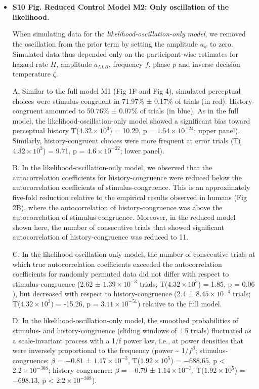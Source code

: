 \documentclass[
]{article}
\begin{document}
\begin{itemize}
\item \textbf{S10 Fig. Reduced Control Model M2: Only oscillation of the likelihood.}

When simulating data for the
\emph{likelihood-oscillation-only model}, we removed the oscillation
from the prior term by setting the amplitude \(a_{\psi}\) to zero.
Simulated data thus depended only on the participant-wise estimates for
hazard rate \(H\), amplitude \(a_{LLR}\), frequency \(f\), phase \(p\)
and inverse decision temperature \(\zeta\).

A. Similar to the full model M1 (Fig 1F and Fig 4), simulated
perceptual choices were stimulus-congruent in 71.97\% ± 0.17\% of trials
(in red). History-congruent amounted to 50.76\% ± 0.07\% of trials (in
blue). As in the full model, the likelihood-oscillation-only model
showed a significant bias toward perceptual history
T(\ensuremath{4.32\times 10^{3}}) = 10.29, p =
\(\ensuremath{1.54\times 10^{-24}}\); upper panel). Similarly,
history-congruent choices were more frequent at error trials
(T(\ensuremath{4.32\times 10^{3}}) = 9.71, p =
\(\ensuremath{4.6\times 10^{-22}}\); lower panel).

B. In the likelihood-oscillation-only model, we observed that the
autocorrelation coefficients for history-congruence were reduced below
the autocorrelation coefficients of stimulus-congruence. This is an
approximately five-fold reduction relative to the empirical results
observed in humans (Fig 2B), where the autocorrelation of
history-congruence was above the autocorrelation of stimulus-congruence.
Moreover, in the reduced model shown here, the number of consecutive
trials that showed significant autocorrelation of history-congruence was
reduced to 11.

C. In the likelihood-oscillation-only model, the number of consecutive
trials at which true autocorrelation coefficients exceeded the
autocorrelation coefficients for randomly permuted data did not differ
with respect to stimulus-congruence (2.62 ±
\ensuremath{1.39\times 10^{-3}} trials;
T(\ensuremath{4.32\times 10^{3}}) = 1.85, p = \(0.06\)), but decreased
with respect to history-congruence (2.4 ±
\ensuremath{8.45\times 10^{-4}} trials;
T(\ensuremath{4.32\times 10^{3}}) = -15.26, p =
\(\ensuremath{3.11\times 10^{-51}}\)) relative to the full model.

D. In the likelihood-oscillation-only model, the smoothed probabilities
of stimulus- and history-congruence (sliding windows of ±5 trials)
fluctuated as a scale-invariant process with a 1/f power law, i.e., at
power densities that were inversely proportional to the frequency (power
\textasciitilde{} 1/\(f^\beta\); stimulus-congruence: \(\beta\) =
\(-0.81\) ± \(\ensuremath{1.17\times 10^{-3}}\),
T(\(\ensuremath{1.92\times 10^{5}}\)) = \(-688.65\), p < \(\ensuremath{2.2\times 10^{-308}}\);
history-congruence: \(\beta\) = \(-0.79\) ±
\(\ensuremath{1.14\times 10^{-3}}\),
T(\(\ensuremath{1.92\times 10^{5}}\)) = \(-698.13\), p < \(\ensuremath{2.2\times 10^{-308}}\)).


\end{itemize}
\end{document}
